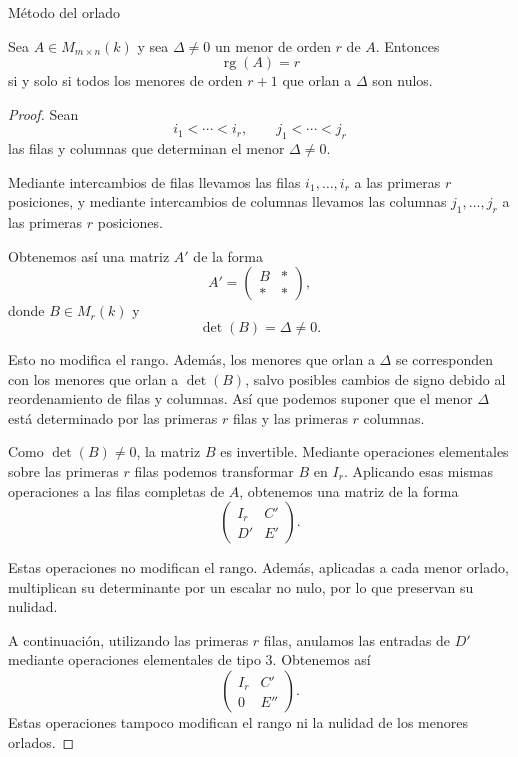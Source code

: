 \begin{frame}[allowframebreaks, t]{Método del orlado}

\begin{theorem}
Sea \(A\in M_{m\times n}(k)\) y sea \(\Delta\neq0\) un menor de
orden \(r\) de \(A\). Entonces
\[
\operatorname{rg}(A)=r
\]
si y solo si todos los menores de orden \(r+1\) que orlan a
\(\Delta\) son nulos.
\end{theorem}

\begin{proof}
Sean
\[
i_1<\cdots<i_r,
\qquad
j_1<\cdots<j_r
\]
las filas y columnas que determinan el menor
\(\Delta\neq0\).

Mediante intercambios de filas llevamos las filas
\(i_1,\ldots,i_r\) a las primeras \(r\) posiciones, y mediante
intercambios de columnas llevamos las columnas
\(j_1,\ldots,j_r\) a las primeras \(r\) posiciones.

Obtenemos así una matriz \(A'\) de la forma
\[
A'=
\left(
\begin{array}{c|c}
B & *\\
\hline
* & *
\end{array}
\right),
\]
donde \(B\in M_r(k)\) y
\[
\det(B)=\Delta\neq0.
\]

Esto no modifica el rango. Además, los menores que orlan a \(\Delta\) se corresponden con los
menores que orlan a \(\det(B)\), salvo posibles cambios de
signo debido al reordenamiento de filas y columnas. Así que podemos suponer que el menor \(\Delta\) está determinado
por las primeras \(r\) filas y las primeras \(r\) columnas.

Como \(\det(B)\neq0\), la matriz \(B\) es invertible. Mediante
operaciones elementales sobre las primeras \(r\) filas podemos
transformar \(B\) en \(I_r\). Aplicando esas mismas operaciones a
las filas completas de \(A\), obtenemos una matriz de la forma
\[
\left(
\begin{array}{c|c}
I_r & C'\\
\hline
D' & E'
\end{array}
\right).
\]

Estas operaciones no modifican el rango. Además, aplicadas a cada
menor orlado, multiplican su determinante por un escalar no nulo,
por lo que preservan su nulidad.

A continuación, utilizando las primeras \(r\) filas, anulamos las
entradas de \(D'\) mediante operaciones elementales de tipo \(3\).
Obtenemos así
\[
\left(
\begin{array}{c|c}
I_r & C'\\
\hline
0 & E''
\end{array}
\right).
\]
Estas operaciones tampoco modifican el rango ni la nulidad de los
menores orlados.


\end{proof}
\end{frame}
